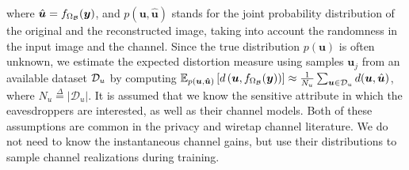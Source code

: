 \documentclass[conference]{IEEEtran}
\begin{document}
	where $\hat{\bm u} = f_{\Omega_{\cal B}}(\bm y)$, and 
	$p(\bm u, \hat{\bm u})$ stands for the joint probability distribution of the original and the reconstructed image, taking into account the randomness in the input image and the channel. 
	Since  the true distribution $p(\bm u)$ is often unknown, we estimate the expected distortion measure  using samples ${\bm u}_j$ from an available  dataset ${\cal D}_u$ by computing $\mathbb{E}_{p(\bm{u},\bm{\hat{u}})} \left[	d\left(\bm u,f_{\Omega_{\cal B}}(\bm y)\right)
	\right] \approx \frac{1}{N_u}\sum_{\bm{u}\in \mathcal{D}_u} d(\bm u, \hat{\bm u})$, where  
	 ${N_{u}} \overset{\Delta}{=} |\mathcal{D}_u|$.
	{It is assumed  that we know the sensitive attribute in which the eavesdroppers are interested, as well as their channel models.  Both of these assumptions  are common  in the privacy \cite{AE-Deniz, Ecenaz-icassp} and wiretap channel \cite{Eduard-AE,  MI-Wiretap-estim, MI-estim-channel_coding} literature.  
	We do not need to know the instantaneous channel gains, but use their distributions to sample channel realizations during training.}     
	
	\vspace{0mm}
\end{document}
